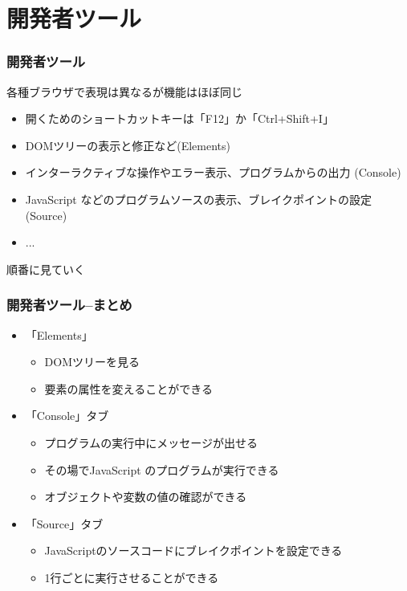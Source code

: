 \section{開発者ツール}
\begin{frame}[containsverbatim]
 \frametitle{開発者ツール}
 各種ブラウザで表現は異なるが機能はほぼ同じ
 \begin{itemize}
  \item 開くためのショートカットキーは「F12」か「Ctrl+Shift+I」
  \item DOMツリーの表示と修正など(Elements)
  \item インターラクティブな操作やエラー表示、プログラムからの出力
        (Console)
  \item JavaScript などのプログラムソースの表示、ブレイクポイントの設定
        (Source)
  \item ...
 \end{itemize}
 順番に見ていく
\end{frame}
\begin{frame}
 \frametitle{開発者ツール--まとめ}
\begin{itemize}
 \item  「Elements」
 \begin{itemize}
	\item DOMツリーを見る
	\item 要素の属性を変えることができる
 \end{itemize}
 \item 「Console」タブ
 \begin{itemize}
	\item プログラムの実行中にメッセージが出せる
	\item その場でJavaScript のプログラムが実行できる
	\item オブジェクトや変数の値の確認ができる
 \end{itemize}
 \item 「Source」タブ
 \begin{itemize}
	\item JavaScriptのソースコードにブレイクポイントを設定できる
	\item 1行ごとに実行させることができる
 \end{itemize}
			 \end{itemize}
\end{frame}
